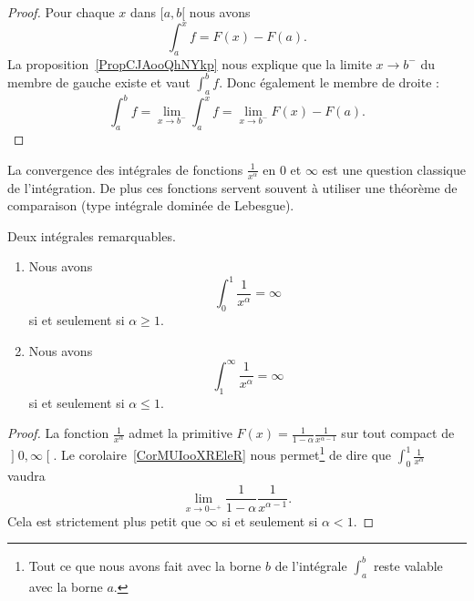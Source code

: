 \begin{proof}
	Pour chaque \( x\) dans \( \mathopen[ a , b [\) nous avons
	\begin{equation}
		\int_a^xf=F(x)-F(a).
	\end{equation}
	La proposition~\ref{PropCJAooQhNYkp} nous explique que la limite \( x\to b^-\) du membre de gauche existe et vaut \( \int_a^bf\). Donc également le membre de droite :
	\begin{equation}
		\int_a^bf=\lim_{x\to b^-} \int_a^xf=\lim_{x\to b^-} F(x)-F(a).
	\end{equation}
\end{proof}

La convergence des intégrales de fonctions \( \frac{1}{ x^{\alpha} }\) en \( 0\) et \( \infty\) est une question classique de l'intégration. De plus ces fonctions servent souvent à utiliser une théorème de comparaison (type intégrale dominée de Lebesgue).
\begin{proposition} \label{PropBKNooPDIPUc}
	Deux intégrales remarquables.
	\begin{enumerate}
		\item

		      Nous avons
		      \begin{equation}
			      \int_0^1\frac{1}{ x^\alpha }=\infty
		      \end{equation}
		      si et seulement si \( \alpha\geq 1\).

		\item   \label{ITEMooJFSXooHmgmEj}

		      Nous avons
		      \begin{equation}
			      \int_1^{\infty}\frac{1}{ x^{\alpha} }=\infty
		      \end{equation}
		      si et seulement si \( \alpha\leq1\).

	\end{enumerate}

\end{proposition}

\begin{proof}
	La fonction \( \frac{1}{ x^{\alpha} }\) admet la primitive \( F(x)=\frac{1}{ 1-\alpha }\frac{1}{ x^{\alpha-1} }\) sur tout compact de \( \mathopen] 0 , \infty \mathclose[\). Le corolaire~\ref{CorMUIooXREleR} nous permet\footnote{Tout ce que nous avons fait avec la borne \( b\) de l'intégrale \( \int_a^b\) reste valable avec la borne \( a\).} de dire que \( \int_0^1\frac{1}{ x^{\alpha} }\) vaudra
	\begin{equation}
		\lim_{x\to 0-^+} \frac{1}{ 1-\alpha }\frac{1}{ x^{\alpha-1} }.
	\end{equation}
	Cela est strictement plus petit que \( \infty\) si et seulement si \( \alpha<1\).
\end{proof}

